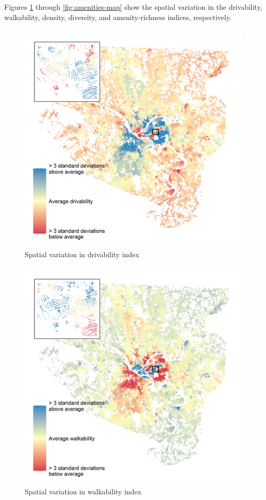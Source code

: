 \documentclass[
]{book}
\begin{document}
Figures \ref{fig:drive-map} through \ref{fig:amenities-map} show the spatial
variation in the drivability, walkability, density, diversity, and amenity-richness indices, respectively.

\begin{figure}
\includegraphics[width=1\linewidth]{04_figures/drivable} \caption{Spatial variation in drivability index}\label{fig:drive-map}
\end{figure}

\begin{figure}
\includegraphics[width=1\linewidth]{04_figures/walkable} \caption{Spatial variation in walkability index}\label{fig:walk-map}
\end{figure}
\end{document}

